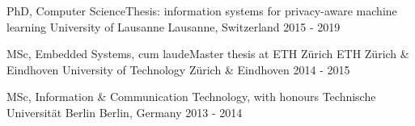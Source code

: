 
\begin{cventries}
  \cventry
    {PhD, Computer Science{\enskip\cdotp\enskip}Thesis: information systems for privacy-aware machine learning}
    {University of Lausanne}
    {Lausanne, Switzerland}
    {2015 - 2019}
    {}

  \cventry
    {MSc, Embedded Systems, cum laude{\enskip\cdotp\enskip}Master thesis at ETH Zürich}
    {ETH Zürich \& Eindhoven University of Technology}
    {Zürich \& Eindhoven}
    {2014 - 2015}
    {}

  \cventry
    {MSc, Information \& Communication Technology, with honours}
    {Technische Universität Berlin}
    {Berlin, Germany}
    {2013 - 2014}
    {}
\end{cventries}
